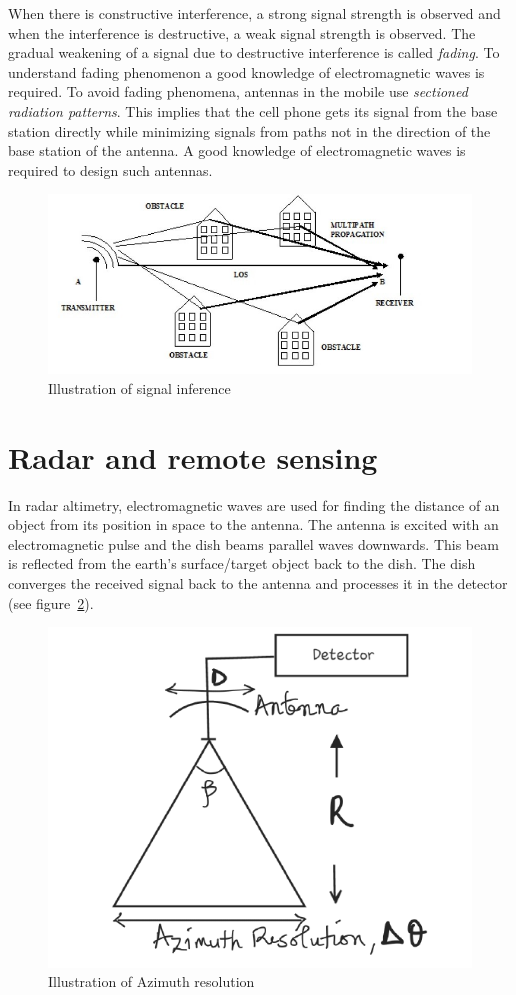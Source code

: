 When there is constructive interference, a strong signal strength is observed and when the interference is destructive, a weak signal strength is observed. The gradual weakening of a signal due to destructive interference is called \textit{fading}. To understand fading phenomenon a good knowledge of electromagnetic waves is required. To avoid fading phenomena, antennas in the mobile use \textit{sectioned radiation patterns}. This implies that the cell phone gets its signal from the base station directly while minimizing signals from paths not in the direction of the base station of the antenna. A good knowledge of electromagnetic waves is required to design such antennas.
\begin{figure}[h]
\centering
\includegraphics[scale=0.4]{./graphics/rod}
\caption{Illustration of signal inference}
\label{fig:rod}
\end{figure}

\section{Radar and remote sensing}
In radar altimetry, electromagnetic waves are used for finding the distance of an object from its position in space to the antenna. The antenna is excited with an electromagnetic pulse and the dish beams parallel waves downwards. This beam is reflected from the earth's surface/target object back to the dish. The dish converges the received signal back to the antenna and processes it in the detector (see figure~\ref{fig:new}).
\begin{figure}[h]
\centering
\includegraphics[width=.8\linewidth]{./graphics/New}
\caption{Illustration of Azimuth resolution}
\label{fig:new}
\end{figure}

